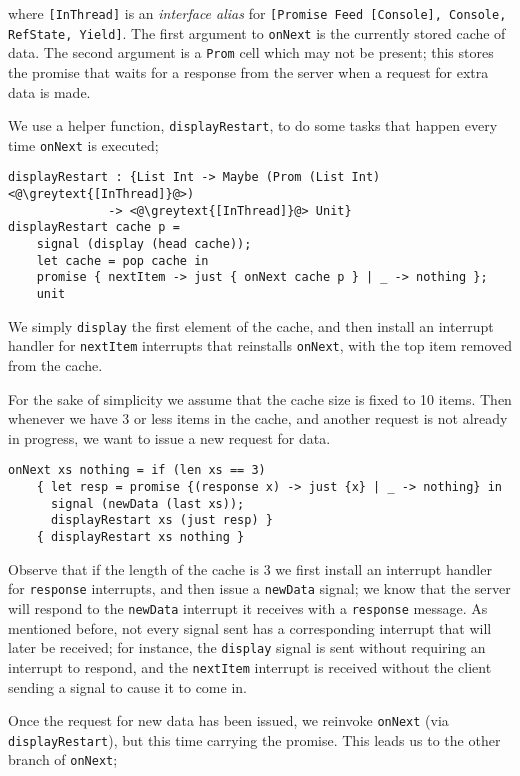 \documentclass[msc,deptreport,cs]{infthesis} %
\newcommand{\code}[1]{\lstinline{#1}}
\newcommand{\greytext}[1]{\textcolor{black!40}{#1}}
\begin{document}
\noindent where \code{[InThread]} is an \emph{interface alias} for
\code{[Promise Feed [Console], Console, RefState, Yield]}. The first argument to
\code{onNext} is the currently stored cache of data. The second argument is a
\code{Prom} cell which may not be present; this stores the promise that waits
for a response from the server when a request for extra data is made.

We use a helper function, \code{displayRestart}, to do some tasks that happen
every time \code{onNext} is executed;

\begin{lstlisting}
displayRestart : {List Int -> Maybe (Prom (List Int) <@\greytext{[InThread]}@>)
              -> <@\greytext{[InThread]}@> Unit}
displayRestart cache p =
    signal (display (head cache));
    let cache = pop cache in
    promise { nextItem -> just { onNext cache p } | _ -> nothing };
    unit
\end{lstlisting}

\noindent We simply \code{display} the first element of the cache, and then
install an interrupt handler for \code{nextItem} interrupts that reinstalls
\code{onNext}, with the top item removed from the cache.

For the sake of simplicity we assume that the cache size is fixed to 10 items.
Then whenever we have 3 or less items in the cache, and another request is not
already in progress, we want to issue a new request for data.

\begin{lstlisting}
onNext xs nothing = if (len xs == 3)
    { let resp = promise {(response x) -> just {x} | _ -> nothing} in
      signal (newData (last xs));
      displayRestart xs (just resp) }
    { displayRestart xs nothing }
\end{lstlisting}

\noindent Observe that if the length of the cache is 3 we first install an
interrupt handler for \code{response} interrupts, and then issue a
\code{newData} signal; we know that the server will respond to the
\code{newData} interrupt it receives with a \code{response} message. As
mentioned before, not every signal sent has a corresponding interrupt that will
later be received; for instance, the \code{display} signal is sent without
requiring an interrupt to respond, and the \code{nextItem} interrupt is received
without the client sending a signal to cause it to come in.

Once the request for new data has been issued, we reinvoke \code{onNext} (via
\code{displayRestart}), but this time carrying the promise. This leads us to the
other branch of \code{onNext};
\end{document}
